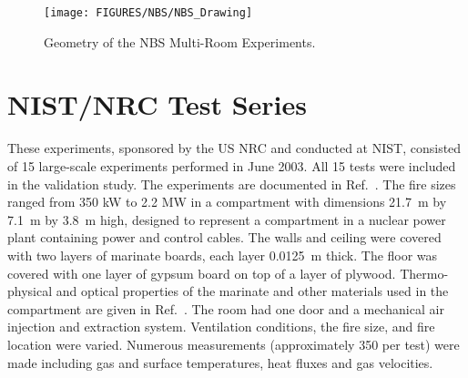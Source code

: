 \begin{figure}
\begin{center}
\texttt{[image: FIGURES/NBS/NBS\_Drawing]}
\end{center}
\caption[Geometry of the NBS Multi-Room Experiments]{Geometry of the NBS Multi-Room Experiments.}
\label{NBS_Drawing}
\end{figure}





\clearpage

\section{NIST/NRC Test Series}

These experiments, sponsored by the US NRC and conducted at NIST, consisted of 15 large-scale experiments performed in June 2003. All 15 tests were
included in the validation study. The experiments are documented in Ref.~\cite{Hamins:SP1013-1}. The fire sizes ranged from 350 kW to 2.2 MW in a compartment with dimensions
21.7~m by 7.1~m by 3.8~m high, designed to represent a compartment in a nuclear power plant containing power and control cables.
The walls and ceiling were covered with two layers of marinate boards, each layer 0.0125~m thick. The floor
was covered with one layer of gypsum board on top of a layer of plywood. Thermo-physical and optical properties of the marinate
and other materials used in the compartment are given in Ref.~\cite{Hamins:SP1013-1}. The room had one door and a mechanical air injection and extraction
system. Ventilation conditions, the fire size, and fire location were varied. Numerous measurements (approximately 350 per test) were made including
gas and surface temperatures, heat fluxes and gas velocities.

